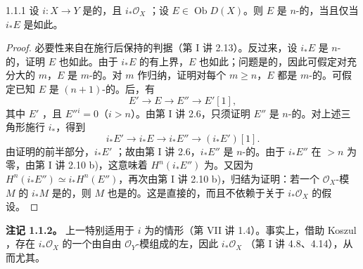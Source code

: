 \begin{SGAresult}{}{1.1.1}
设 $i:X\to Y$ 是的，且 $i_*\mathcal O_X$ ；设 $E\in\operatorname{Ob}D(X)$。则 $E$ 是 $n$-的，当且仅当 $i_*E$ 是如此。
\end{SGAresult}
\begin{proof}
必要性来自在施行后保持的判据（第 I 讲 2.13）。反过来，设 $i_*E$ 是 $n$-的，证明 $E$ 也如此。由于 $i_*E$ 的有上界，$E$ 也如此；问题是的，因此可假定对充分大的 $m$，$E$ 是 $m$-的。对 $m$ 作归纳，证明对每个 $m\ge n$，$E$ 都是 $m$-的。可假定已知 $E$ 是 $(n+1)$-的。后，有
\[
E'\longrightarrow E\longrightarrow E''\longrightarrow E'[1],
\]
其中 $E'$ ，且 $E''{}^i=0$（$i>n$）。由第 I 讲 2.6，只须证明 $E''$ 是 $n$-的。对上述三角形施行 $i_*$，得到
\[
i_*E'\longrightarrow i_*E\longrightarrow i_*E''\longrightarrow(i_*E')[1].
\]
由证明的前半部分，$i_*E'$ ；故由第 I 讲 2.6，$i_*E''$ 是 $n$-的。由于 $i_*E''$ 在 $>n$ 为零，由第 I 讲 2.10 b)，这意味着 $H^n(i_*E'')$ 为。又因为 $H^n(i_*E'')\simeq i_*H^n(E'')$，再次由第 I 讲 2.10 b)，归结为证明：若一个 $\mathcal O_X$-模 $M$ 的 $i_*M$ 是的，则 $M$ 也是的。这是直接的，而且不依赖于关于 $i_*\mathcal O_X$ 的假设。
\end{proof}
\textbf{注记 1.1.2。} 上一特别适用于 $i$ 为的情形（第 VII 讲 1.4）。事实上，借助 Koszul ，存在 $i_*\mathcal O_X$ 的一个由自由 $\mathcal O_Y$-模组成的左，因此 $i_*\mathcal O_X$ （第 I 讲 4.8、4.14），从而尤其。
